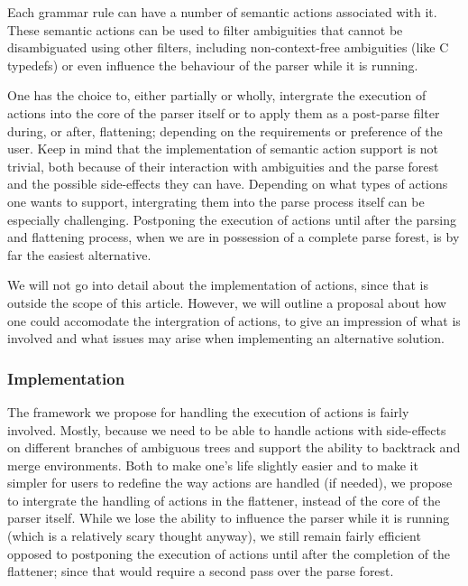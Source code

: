 \documentclass[a4paper,10pt]{article}
\begin{document}
Each grammar rule can have a number of semantic actions associated with it. These semantic actions can be used to filter ambiguities that cannot be disambiguated using other filters, including non-context-free ambiguities (like C typedefs) or even influence the behaviour of the parser while it is running.

One has the choice to, either partially or wholly, intergrate the execution of actions into the core of the parser itself or to apply them as a post-parse filter during, or after, flattening; depending on the requirements or preference of the user. Keep in mind that the implementation of semantic action support is not trivial, both because of their interaction with ambiguities and the parse forest and the possible side-effects they can have. Depending on what types of actions one wants to support, intergrating them into the parse process itself can be especially challenging. Postponing the execution of actions until after the parsing and flattening process, when we are in possession of a complete parse forest, is by far the easiest alternative.

We will not go into detail about the implementation of actions, since that is outside the scope of this article. However, we will outline a proposal about how one could accomodate the intergration of actions, to give an impression of what is involved and what issues may arise when implementing an alternative solution.

\subsubsection{Implementation}
The framework we propose for handling the execution of actions is fairly involved. Mostly, because we need to be able to handle actions with side-effects on different branches of ambiguous trees and support the ability to backtrack and merge environments. Both to make one's life slightly easier and to make it simpler for users to redefine the way actions are handled (if needed), we propose to intergrate the handling of actions in the flattener, instead of the core of the parser itself. While we lose the ability to influence the parser while it is running (which is a relatively scary thought anyway), we still remain fairly efficient opposed to postponing the execution of actions until after the completion of the flattener; since that would require a second pass over the parse forest.
\end{document}
